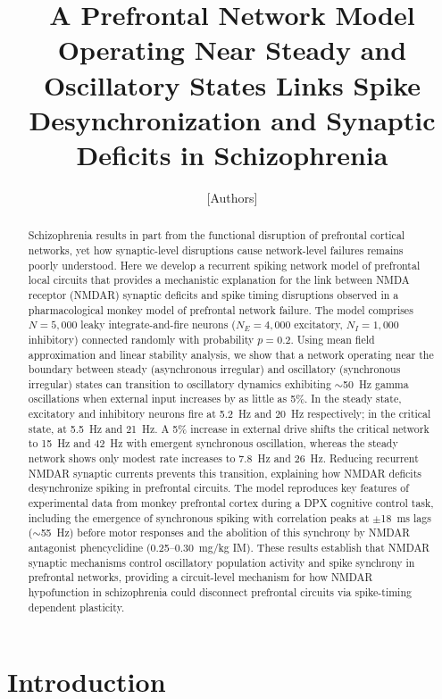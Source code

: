 \documentclass[10pt]{article}
\title{A Prefrontal Network Model Operating Near Steady and Oscillatory States Links Spike Desynchronization and Synaptic Deficits in Schizophrenia}
\author{[Authors]}
\date{}
\begin{document}
\maketitle

\begin{abstract}
Schizophrenia results in part from the functional disruption of prefrontal cortical networks, yet how synaptic-level disruptions cause network-level failures remains poorly understood. Here we develop a recurrent spiking network model of prefrontal local circuits that provides a mechanistic explanation for the link between NMDA receptor (NMDAR) synaptic deficits and spike timing disruptions observed in a pharmacological monkey model of prefrontal network failure. The model comprises $N = 5{,}000$ leaky integrate-and-fire neurons ($N_E = 4{,}000$ excitatory, $N_I = 1{,}000$ inhibitory) connected randomly with probability $p = 0.2$. Using mean field approximation and linear stability analysis, we show that a network operating near the boundary between steady (asynchronous irregular) and oscillatory (synchronous irregular) states can transition to oscillatory dynamics exhibiting $\sim$50~Hz gamma oscillations when external input increases by as little as 5\%. In the steady state, excitatory and inhibitory neurons fire at 5.2~Hz and 20~Hz respectively; in the critical state, at 5.5~Hz and 21~Hz. A 5\% increase in external drive shifts the critical network to 15~Hz and 42~Hz with emergent synchronous oscillation, whereas the steady network shows only modest rate increases to 7.8~Hz and 26~Hz. Reducing recurrent NMDAR synaptic currents prevents this transition, explaining how NMDAR deficits desynchronize spiking in prefrontal circuits. The model reproduces key features of experimental data from monkey prefrontal cortex during a DPX cognitive control task, including the emergence of synchronous spiking with correlation peaks at $\pm$18~ms lags ($\sim$55~Hz) before motor responses and the abolition of this synchrony by NMDAR antagonist phencyclidine (0.25--0.30~mg/kg IM). These results establish that NMDAR synaptic mechanisms control oscillatory population activity and spike synchrony in prefrontal networks, providing a circuit-level mechanism for how NMDAR hypofunction in schizophrenia could disconnect prefrontal circuits via spike-timing dependent plasticity.
\end{abstract}

\section{Introduction}
\end{document}

